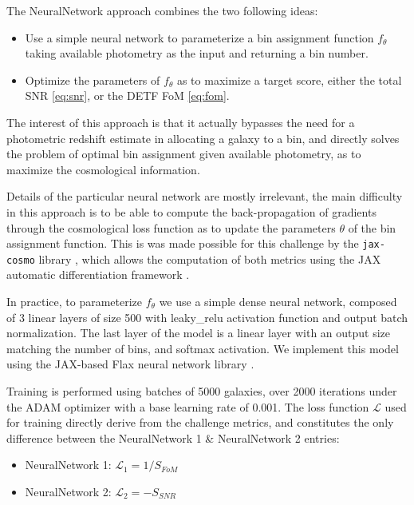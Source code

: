 \documentclass[twocolumn,twocolappendix]{aastex63}
\begin{document}
The {\sc NeuralNetwork} approach combines the two following ideas:
\begin{itemize}
	\item Use a simple neural network to parameterize a bin assignment function $f_\theta$ taking available photometry as the input and returning a bin number. 
	\item Optimize the parameters of $f_\theta$ as to maximize a target score, either the total SNR \autoref{eq:snr}, or the DETF FoM \autoref{eq:fom}.
\end{itemize}
The interest of this approach is that it actually bypasses the need for a photometric redshift estimate in allocating a galaxy to a bin, and directly solves the problem of optimal bin assignment given available photometry, as to maximize the cosmological information.


Details of the particular neural network are mostly irrelevant, the main difficulty in this approach is to be able to compute the back-propagation of gradients through the cosmological loss function as to update the parameters $\theta$ of the bin assignment function. This is was made possible for this challenge by the \texttt{jax-cosmo} library \citep{jax-cosmo}, which allows the computation of both metrics using the JAX automatic differentiation framework \citep{jax}. 


In practice, to parameterize $f_\theta$ we use a simple dense neural network, composed of 3 linear layers of size 500 with leaky\_relu activation function and output batch normalization. The last layer of the model is a linear layer with an output size matching the number of bins, and softmax activation. We implement this model using the JAX-based Flax neural network library \citep{flax2020github}. 

Training is performed using batches of 5000 galaxies, over 2000 iterations under the ADAM optimizer \citep{adam} with a base learning rate of 0.001. The loss function $\mathcal{L}$ used for training directly derive from the challenge metrics, and constitutes the only difference between the NeuralNetwork 1 \& NeuralNetwork 2 entries:

\begin{itemize}
	\item NeuralNetwork 1: $\mathcal{L}_1 = 1 / S_{FoM}$
	\item NeuralNetwork 2: $\mathcal{L}_2 = - S_{SNR} $
\end{itemize}  


\end{document}
